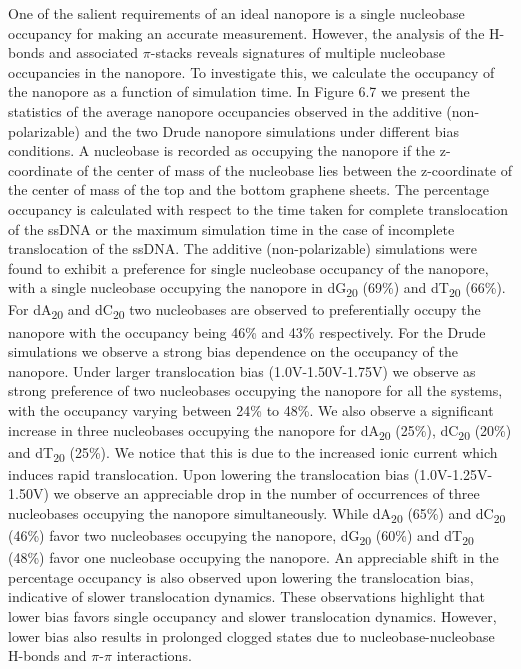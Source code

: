 One of the salient requirements of an ideal nanopore is a single nucleobase occupancy for making an accurate measurement. However, the analysis of the H-bonds and associated $\pi$-stacks reveals signatures of multiple nucleobase occupancies in the nanopore. To investigate this, we calculate the occupancy of the nanopore as a function of simulation time. In Figure 6.7 we present the statistics of the average nanopore occupancies observed in the additive (non-polarizable) and the two Drude nanopore simulations under different bias conditions. A nucleobase is recorded as occupying the nanopore if the z-coordinate of the center of mass of the nucleobase lies between the z-coordinate of the center of mass of the top and the bottom graphene sheets. The percentage occupancy is calculated with respect to the time taken for complete translocation of the ssDNA or the maximum simulation time in the case of incomplete translocation of the ssDNA. The additive (non-polarizable) simulations were found to exhibit a preference for single nucleobase occupancy of the nanopore, with a single nucleobase occupying the nanopore in dG\textsubscript{20} (69\%) and dT\textsubscript{20} (66\%). For dA\textsubscript{20} and dC\textsubscript{20} two nucleobases are observed to preferentially occupy the nanopore with the occupancy being 46\% and 43\% respectively. For the Drude simulations we observe a strong bias dependence on the occupancy of the nanopore. Under larger translocation bias (1.0V-1.50V-1.75V) we observe as strong preference of two nucleobases occupying the nanopore for all the systems, with the occupancy varying between 24\% to 48\%. We also observe a significant increase in three nucleobases occupying the nanopore for dA\textsubscript{20} (25\%), dC\textsubscript{20} (20\%) and dT\textsubscript{20} (25\%). We notice that this is due to the increased ionic current which induces rapid translocation. Upon lowering the translocation bias (1.0V-1.25V-1.50V) we observe an appreciable drop in the number of occurrences of three nucleobases occupying the nanopore simultaneously. While dA\textsubscript{20} (65\%) and dC\textsubscript{20} (46\%) favor two nucleobases occupying the nanopore, dG\textsubscript{20} (60\%) and dT\textsubscript{20} (48\%) favor one nucleobase occupying the nanopore. An appreciable shift in the percentage occupancy is also observed upon lowering the translocation bias, indicative of slower translocation dynamics. These observations highlight that lower bias favors single occupancy and slower translocation dynamics. However, lower bias also results in prolonged clogged states due to nucleobase-nucleobase H-bonds and $\pi$-$\pi$ interactions. 

